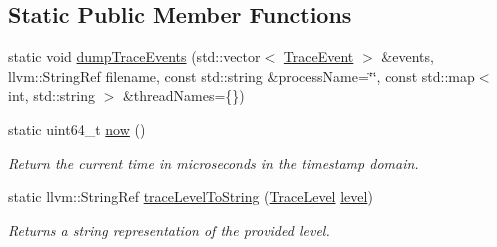 \subsection*{Static Public Member Functions}
\begin{DoxyCompactItemize}
\item 
static void \hyperlink{structglow_1_1_trace_event_acbca9b65c5383467f89f034312d1160c}{dump\+Trace\+Events} (std\+::vector$<$ \hyperlink{structglow_1_1_trace_event}{Trace\+Event} $>$ \&events, llvm\+::\+String\+Ref filename, const std\+::string \&process\+Name=\char`\"{}\char`\"{}, const std\+::map$<$ int, std\+::string $>$ \&thread\+Names=\{\})
\item 
\mbox{\label{structglow_1_1_trace_event_a67efc5d9cc716387a4404b8923a5b7c8}} 
static uint64\+\_\+t \hyperlink{structglow_1_1_trace_event_a67efc5d9cc716387a4404b8923a5b7c8}{now} ()
\begin{DoxyCompactList}\small\item\em Return the current time in microseconds in the timestamp domain. \end{DoxyCompactList}\item 
\mbox{\label{structglow_1_1_trace_event_aa356b5fc6b12af1f12e3d80f557ae8be}} 
static llvm\+::\+String\+Ref \hyperlink{structglow_1_1_trace_event_aa356b5fc6b12af1f12e3d80f557ae8be}{trace\+Level\+To\+String} (\hyperlink{structglow_1_1_trace_event_a10132a384d74408a112510cbe1b7d978}{Trace\+Level} \hyperlink{structglow_1_1_trace_event_adad40f9005c398fa9704c40ec81e16f6}{level})
\begin{DoxyCompactList}\small\item\em Returns a string representation of the provided {\ttfamily level}. \end{DoxyCompactList}\end{DoxyCompactItemize}
